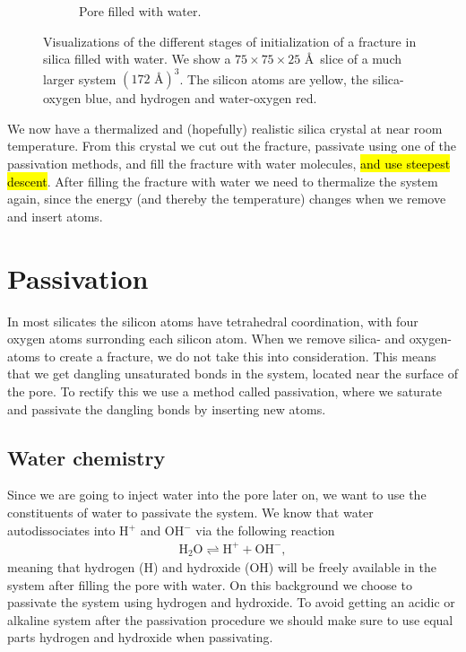 \begin{figure}[htpb]
\begin{subfigure}[t]{\myfigwidth}
        \caption{%
            Pore filled with water.%
            \label{fig:initialization_step05}%
        }%
        \hspace{8pt}
    \end{subfigure}%
    \captionsetup{width=\textwidth}%
    \caption{%
        Visualizations of the different stages of initialization of a fracture in silica filled with water. We show a $75\times 75\times 25$ \AA\ slice of a much larger system $(172 \text{ \AA})^3$. The silicon atoms are yellow, the silica-oxygen blue, and hydrogen and water-oxygen red. %
        \label{fig:initialization_steps}%
    }%
\end{figure}%

We now have a thermalized and (hopefully) realistic silica crystal at near room temperature. From this crystal we cut out the fracture, passivate using one of the passivation methods, and fill the fracture with water molecules, \hl{and use steepest descent}. After filling the fracture with water we need to thermalize the system again, since the energy (and thereby the temperature) changes when we remove and insert atoms.

\section{Passivation}
In most silicates the silicon atoms have tetrahedral coordination, with four oxygen atoms surronding each silicon atom. When we remove silica- and oxygen-atoms to create a fracture, we do not take this into consideration. This means that we get dangling unsaturated bonds in the system, located near the surface of the pore. To rectify this we use a method called passivation, where we saturate and passivate the dangling bonds by inserting new atoms. 

\subsection{Water chemistry}
Since we are going to inject water into the pore later on, we want to use the constituents of water to passivate the system. We know that water autodissociates into H$^{+}$ and OH$^{-}$ via the following reaction
\begin{align*}
    \text{H}_2\text{O} \rightleftharpoons \text{H}^{+} + \text{OH}^{-},
\end{align*}
meaning that hydrogen (H) and hydroxide (OH) will be freely available in the system after filling the pore with water. On this background we choose to passivate the system using hydrogen and hydroxide. To avoid getting an acidic or alkaline system after the passivation procedure we should make sure to use equal parts hydrogen and hydroxide when passivating.

